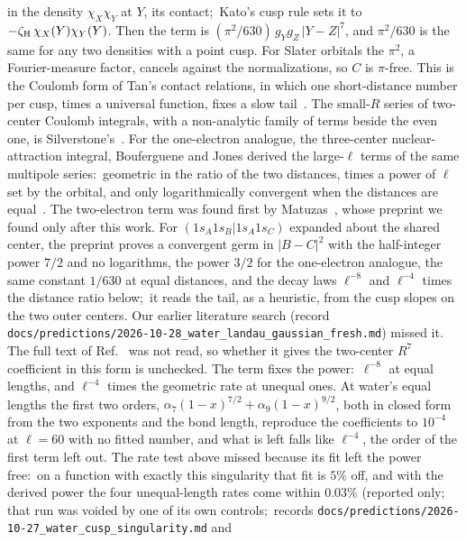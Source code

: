\documentclass[aps,pra,twocolumn,superscriptaddress,longbibliography]{revtex4-2}
\begin{document}
in the density $\chi_X\chi_Y$ at $Y$, its contact;\ Kato's cusp rule sets it to
$-\zeta_{\rm H}\,\chi_X(Y)\chi_Y(Y)$.  Then the term is $(\pi^{2}/630)\,g_Y g_Z\,|Y-Z|^{7}$, and
$\pi^{2}/630$ is the same for any two densities with a point cusp.  For Slater orbitals the
$\pi^{2}$, a Fourier-measure factor, cancels against the normalizations, so $C$ is $\pi$-free.
This is the Coulomb form of Tan's contact relations, in which one short-distance number per
cusp, times a universal function, fixes a slow tail~\cite{hofmann2013}.
The small-$R$ series of two-center Coulomb integrals, with a non-analytic family of terms
beside the even one, is Silverstone's~\cite{silverstone1967}.  For the one-electron
analogue, the three-center nuclear-attraction integral, Bouferguene and Jones derived the
large-$\ell$ terms of the same multipole series:\ geometric in the ratio of the two distances,
times a power of $\ell$ set by the orbital, and only logarithmically convergent when the
distances are equal~\cite{bouferguene1998}.  The two-electron term was found first by
Matuzas~\cite{matuzas2026sc}, whose preprint we found only after this work.  For
$(1s_A1s_B|1s_A1s_C)$ expanded about the shared center, the preprint proves a convergent germ in
$|B-C|^{2}$ with the half-integer power $7/2$ and no logarithms, the power $3/2$ for the
one-electron analogue, the same constant $1/630$ at equal distances, and the decay laws
$\ell^{-8}$ and $\ell^{-4}$ times the distance ratio below;\ it reads the tail, as a
heuristic, from the cusp slopes on the two outer centers.  Our earlier literature search
(record \texttt{docs/predictions/2026-10-28\_water\_landau\_gaussian\_fresh.md}) missed it.
The full text of Ref.~\cite{silverstone1967} was not read, so whether it gives the two-center
$R^{7}$ coefficient in this form is unchecked.
The term fixes the power:\ $\ell^{-8}$ at equal lengths, and $\ell^{-4}$ times the geometric
rate at unequal ones.  At water's equal lengths the first two orders, $\alpha_7(1-x)^{7/2}+
\alpha_9(1-x)^{9/2}$, both in closed form from the two exponents and the bond length, reproduce
the coefficients to $10^{-4}$ at $\ell=60$ with no fitted number, and what is left falls like
$\ell^{-4}$, the order of the first term left out.  The rate test above missed because its
fit left the power free:\ on a function with exactly this singularity that fit is $5\%$ off,
and with the derived power the four unequal-length rates come within $0.03\%$ (reported only;
that run was voided by one of its own controls;\ records
\texttt{docs/predictions/2026-10-27\_water\_cusp\_singularity.md} and
\end{document}
